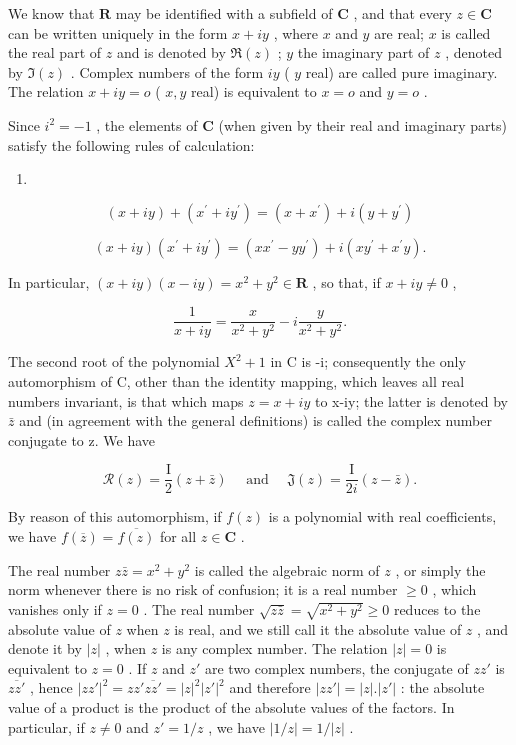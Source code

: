 We know that \(\mathbf{R}\) may be identified with a subfield of \(\mathbf{C}\) , and that every \(z \in \mathbf{C}\) can be written uniquely in the form \(x + iy\) , where \(x\) and \(y\) are real; \(x\) is called the real part of \(z\) and is denoted by \(\Re(z)\) ; \(y\) the imaginary part of \(z\) , denoted by \(\Im(z)\) . Complex numbers of the form \(iy\) ( \(y\) real) are called pure imaginary. The relation \(x + iy = o\) ( \(x, y\) real) is equivalent to \(x = o\) and \(y = o\) .

Since \(i^2 = -1\) , the elements of \(\mathbf{C}\) (when given by their real and imaginary parts) satisfy the following rules of calculation:

\begin{enumerate}
\def\labelenumi{(\arabic{enumi})}
\tightlist
\item
\end{enumerate}

\[
(x + i y) + (x ^ {\prime} + i y ^ {\prime}) = (x + x ^ {\prime}) + i (y + y ^ {\prime})\tag{2}
\]

\[
(x + i y) (x ^ {\prime} + i y ^ {\prime}) = (x x ^ {\prime} - y y ^ {\prime}) + i (x y ^ {\prime} + x ^ {\prime} y).
\]

In particular, \((x + iy)(x - iy) = x^{2} + y^{2}\in \mathbf{R}\) , so that, if \(x + iy\neq 0\) ,

\[
\frac {1}{x + i y} = \frac {x}{x ^ {2} + y ^ {2}} - i \frac {y}{x ^ {2} + y ^ {2}}.\tag{3}
\]

The second root of the polynomial \(X^{2}+1\) in C is -i; consequently the only automorphism of C, other than the identity mapping, which leaves all real numbers invariant, is that which maps \(z=x+iy\) to x-iy; the latter is denoted by \(\bar{z}\) and (in agreement with the general definitions) is called the complex number conjugate to z. We have

\[
\mathcal {R} (z) = \frac {\mathrm{I}}{2} (z + \bar {z}) \quad \text { and } \quad \mathfrak {J} (z) = \frac {\mathrm{I}}{2 i} (z - \bar {z}).
\]

By reason of this automorphism, if \(f(z)\) is a polynomial with real coefficients, we have \(f(\overline{z}) = \overline{f(z)}\) for all \(z \in \mathbf{C}\) .

The real number \(z\bar{z} = x^2 + y^2\) is called the algebraic norm of \(z\) , or simply the norm whenever there is no risk of confusion; it is a real number \(\geqslant 0\) , which vanishes only if \(z = 0\) . The real number \(\sqrt{z\bar{z}} = \sqrt{x^2 + y^2} \geqslant 0\) reduces to the absolute value of \(z\) when \(z\) is real, and we still call it the absolute value of \(z\) , and denote it by \(|z|\) , when \(z\) is any complex number. The relation \(|z| = 0\) is equivalent to \(z = 0\) . If \(z\) and \(z'\) are two complex numbers, the conjugate of \(zz'\) is \(\overline{zz'}\) , hence \(|zz'|^2 = zz' \overline{zz'} = |z|^2 |z'|^2\) and therefore \(|zz'| = |z|. |z'|\) : the absolute value of a product is the product of the absolute values of the factors. In particular, if \(z \neq 0\) and \(z' = 1/z\) , we have \(|1/z| = 1/|z|\) .

